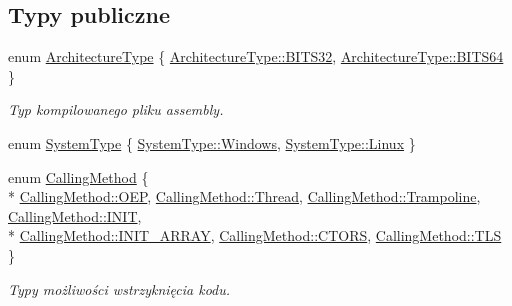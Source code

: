 \subsection*{Typy publiczne}
\begin{DoxyCompactItemize}
\item 
enum \hyperlink{class_d_adding_methods_a7d062c443c04f37689dbececc36cf4a3}{Architecture\-Type} \{ \hyperlink{class_d_adding_methods_a7d062c443c04f37689dbececc36cf4a3a19c324fc35adafffc05d643f63e8eb5e}{Architecture\-Type\-::\-B\-I\-T\-S32}, 
\hyperlink{class_d_adding_methods_a7d062c443c04f37689dbececc36cf4a3a316bc10be99a2862edd96d24e0d150d9}{Architecture\-Type\-::\-B\-I\-T\-S64}
 \}
\begin{DoxyCompactList}\small\item\em Typ kompilowanego pliku assembly. \end{DoxyCompactList}\item 
enum \hyperlink{class_d_adding_methods_a14e87405d457c7c3671eca0e74b3f327}{System\-Type} \{ \hyperlink{class_d_adding_methods_a14e87405d457c7c3671eca0e74b3f327aaea23489ce3aa9b6406ebb28e0cda430}{System\-Type\-::\-Windows}, 
\hyperlink{class_d_adding_methods_a14e87405d457c7c3671eca0e74b3f327aedc9f0a5a5d57797bf68e37364743831}{System\-Type\-::\-Linux}
 \}
\item 
enum \hyperlink{class_d_adding_methods_a8b52c07f1794d8c6cdd6f9b98be2bbf0}{Calling\-Method} \{ \\*
\hyperlink{class_d_adding_methods_a8b52c07f1794d8c6cdd6f9b98be2bbf0a1f69192f5c5359619a4410d97d1655be}{Calling\-Method\-::\-O\-E\-P}, 
\hyperlink{class_d_adding_methods_a8b52c07f1794d8c6cdd6f9b98be2bbf0ad97477d6d8a838ead9348185bb5b6742}{Calling\-Method\-::\-Thread}, 
\hyperlink{class_d_adding_methods_a8b52c07f1794d8c6cdd6f9b98be2bbf0ad113494f870355ce123dfb74beea602d}{Calling\-Method\-::\-Trampoline}, 
\hyperlink{class_d_adding_methods_a8b52c07f1794d8c6cdd6f9b98be2bbf0afaee4ca3c30ee18148ce3ada37466498}{Calling\-Method\-::\-I\-N\-I\-T}, 
\\*
\hyperlink{class_d_adding_methods_a8b52c07f1794d8c6cdd6f9b98be2bbf0a8c11d1b1290b76379bf90434c0e83f4a}{Calling\-Method\-::\-I\-N\-I\-T\-\_\-\-A\-R\-R\-A\-Y}, 
\hyperlink{class_d_adding_methods_a8b52c07f1794d8c6cdd6f9b98be2bbf0a02f11aadd3ab1bd5b7ccd3040d8a0075}{Calling\-Method\-::\-C\-T\-O\-R\-S}, 
\hyperlink{class_d_adding_methods_a8b52c07f1794d8c6cdd6f9b98be2bbf0a099d7d04319e5191b7473e016c55e320}{Calling\-Method\-::\-T\-L\-S}
 \}
\begin{DoxyCompactList}\small\item\em Typy możliwości wstrzyknięcia kodu. \end{DoxyCompactList}\end{DoxyCompactItemize}

